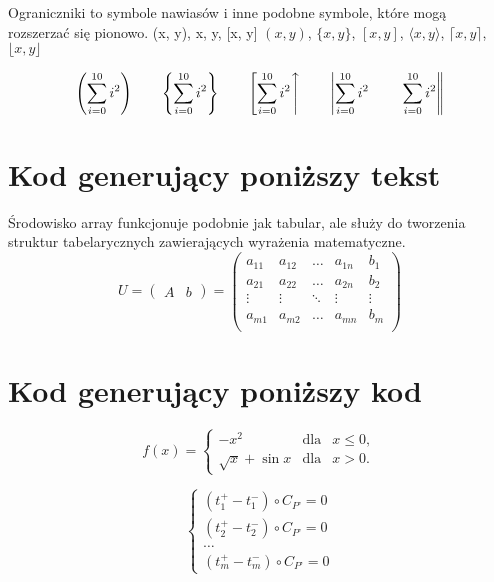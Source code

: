 \documentclass[a4paper,12pt]{article}
\begin{document}
	Ograniczniki to symbole nawiasów i inne podobne symbole, które mogą rozszerzać się pionowo.
	(x, y), {x, y}, [x, y]
	$(x,y)$, $\{x,y\}$, $[x,y]$, $\langle x,y \rangle$,
	$\lceil x,y \rceil$, $\lfloor x,y \rfloor$
	
	$$
	\left(\sum_{i = 0}^{10} i^2 \right)\qquad
	\left\{\sum_{i = 0}^{10} i^2 \right\}\qquad
	\left[\sum_{i = 0}^{10} i^2 \right\uparrow\qquad
	\left\vert\sum_{i = 0}^{10} i^2 \right.\qquad
	\left.\sum_{i = 0}^{10} i^2 \right\Vert
	$$
	
	
	
	\section{Kod generujący poniższy tekst}
	Środowisko array funkcjonuje podobnie jak tabular, ale służy do tworzenia
	struktur tabelarycznych zawierających wyrażenia matematyczne.
	$$
	U = \left( \begin{array}{cc} A & b \end{array} \right) =
	\left(
	\begin{array}{lllll}
		a_{11} & a_{12} & \dots & a_{1n} & b_1\\
		a_{21} & a_{22} & \dots & a_{2n} & b_2\\
		\vdots & \vdots & \ddots & \vdots & \vdots\\
		a_{m1} & a_{m2} & \dots & a_{mn} & b_m\\
	\end{array}
	\right)
	$$
	
	
	
	
	\section{Kod generujący poniższy kod}
	\begin{equation}
		\label{eq:funkcjaf}
		f(x) = \left\lbrace
		\begin{array}{rcl}
			-x^2 & \text{dla} & x \leqslant 0,\\
			\sqrt{x} + \sin x & \text{dla} & x > 0.
		\end{array}\right.
	\end{equation}
	
	\begin{equation}
		\left\{\begin{array}{l}
			(t_1^{+} - t_1^{-}) \circ C_{P’} = 0\\
			(t_2^{+} - t_2^{-}) \circ C_{P’} = 0\\
			\dots\\
			(t_m^{+} - t_m^{-}) \circ C_{P’} = 0
		\end{array}\right.
	\end{equation}
	
\end{document}
